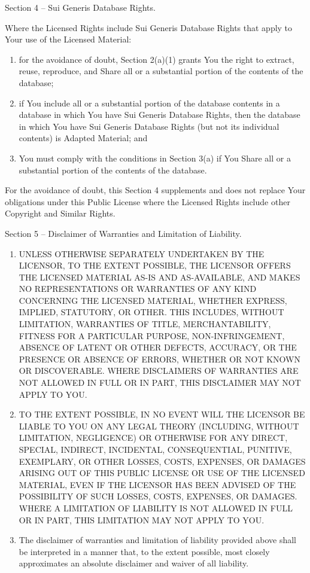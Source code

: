 \documentclass[]{article}
\begin{document}
Section 4 -- Sui Generis Database Rights.

Where the Licensed Rights include Sui Generis Database Rights that apply
to Your use of the Licensed Material:

\begin{enumerate}
\def\labelenumi{\alph{enumi}.}
\item
  for the avoidance of doubt, Section 2(a)(1) grants You the right to
  extract, reuse, reproduce, and Share all or a substantial portion of
  the contents of the database;
\item
  if You include all or a substantial portion of the database contents
  in a database in which You have Sui Generis Database Rights, then the
  database in which You have Sui Generis Database Rights (but not its
  individual contents) is Adapted Material; and
\item
  You must comply with the conditions in Section 3(a) if You Share all
  or a substantial portion of the contents of the database.
\end{enumerate}

For the avoidance of doubt, this Section 4 supplements and does not
replace Your obligations under this Public License where the Licensed
Rights include other Copyright and Similar Rights.

Section 5 -- Disclaimer of Warranties and Limitation of Liability.

\begin{enumerate}
\def\labelenumi{\alph{enumi}.}
\item
  UNLESS OTHERWISE SEPARATELY UNDERTAKEN BY THE LICENSOR, TO THE EXTENT
  POSSIBLE, THE LICENSOR OFFERS THE LICENSED MATERIAL AS-IS AND
  AS-AVAILABLE, AND MAKES NO REPRESENTATIONS OR WARRANTIES OF ANY KIND
  CONCERNING THE LICENSED MATERIAL, WHETHER EXPRESS, IMPLIED, STATUTORY,
  OR OTHER. THIS INCLUDES, WITHOUT LIMITATION, WARRANTIES OF TITLE,
  MERCHANTABILITY, FITNESS FOR A PARTICULAR PURPOSE, NON-INFRINGEMENT,
  ABSENCE OF LATENT OR OTHER DEFECTS, ACCURACY, OR THE PRESENCE OR
  ABSENCE OF ERRORS, WHETHER OR NOT KNOWN OR DISCOVERABLE. WHERE
  DISCLAIMERS OF WARRANTIES ARE NOT ALLOWED IN FULL OR IN PART, THIS
  DISCLAIMER MAY NOT APPLY TO YOU.
\item
  TO THE EXTENT POSSIBLE, IN NO EVENT WILL THE LICENSOR BE LIABLE TO YOU
  ON ANY LEGAL THEORY (INCLUDING, WITHOUT LIMITATION, NEGLIGENCE) OR
  OTHERWISE FOR ANY DIRECT, SPECIAL, INDIRECT, INCIDENTAL,
  CONSEQUENTIAL, PUNITIVE, EXEMPLARY, OR OTHER LOSSES, COSTS, EXPENSES,
  OR DAMAGES ARISING OUT OF THIS PUBLIC LICENSE OR USE OF THE LICENSED
  MATERIAL, EVEN IF THE LICENSOR HAS BEEN ADVISED OF THE POSSIBILITY OF
  SUCH LOSSES, COSTS, EXPENSES, OR DAMAGES. WHERE A LIMITATION OF
  LIABILITY IS NOT ALLOWED IN FULL OR IN PART, THIS LIMITATION MAY NOT
  APPLY TO YOU.
\item
  The disclaimer of warranties and limitation of liability provided
  above shall be interpreted in a manner that, to the extent possible,
  most closely approximates an absolute disclaimer and waiver of all
  liability.
\end{enumerate}
\end{document}
